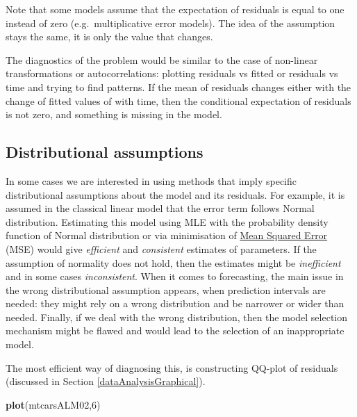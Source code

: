\documentclass[
]{book}
\newenvironment{Shaded}{\begin{snugshade}}{\end{snugshade}}
\newcommand{\DecValTok}[1]{\textcolor[rgb]{0.00,0.00,0.81}{#1}}
\newcommand{\FunctionTok}[1]{\textcolor[rgb]{0.13,0.29,0.53}{\textbf{#1}}}
\newcommand{\NormalTok}[1]{#1}
\theoremstyle{definition}
\theoremstyle{definition}
\theoremstyle{definition}
\theoremstyle{definition}
\theoremstyle{remark}
\begin{document}
Note that some models assume that the expectation of residuals is equal to one instead of zero (e.g.~multiplicative error models). The idea of the assumption stays the same, it is only the value that changes.

The diagnostics of the problem would be similar to the case of non-linear transformations or autocorrelations: plotting residuals vs fitted or residuals vs time and trying to find patterns. If the mean of residuals changes either with the change of fitted values of with time, then the conditional expectation of residuals is not zero, and something is missing in the model.

\subsection{Distributional assumptions}\label{assumptionsDistribution}

In some cases we are interested in using methods that imply specific distributional assumptions about the model and its residuals. For example, it is assumed in the classical linear model that the error term follows Normal distribution. Estimating this model using MLE with the probability density function of Normal distribution or via minimisation of \hyperref[errorMeasures]{Mean Squared Error} (MSE) would give \emph{efficient} and \emph{consistent} estimates of parameters. If the assumption of normality does not hold, then the estimates might be \emph{inefficient} and in some cases \emph{inconsistent}. When it comes to forecasting, the main issue in the wrong distributional assumption appears, when prediction intervals are needed: they might rely on a wrong distribution and be narrower or wider than needed. Finally, if we deal with the wrong distribution, then the model selection mechanism might be flawed and would lead to the selection of an inappropriate model.

The most efficient way of diagnosing this, is constructing QQ-plot of residuals (discussed in Section \ref{dataAnalysisGraphical}).

\begin{Shaded}
\begin{Highlighting}[]
\FunctionTok{plot}\NormalTok{(mtcarsALM02,}\DecValTok{6}\NormalTok{)}
\end{Highlighting}
\end{Shaded}
\end{document}
